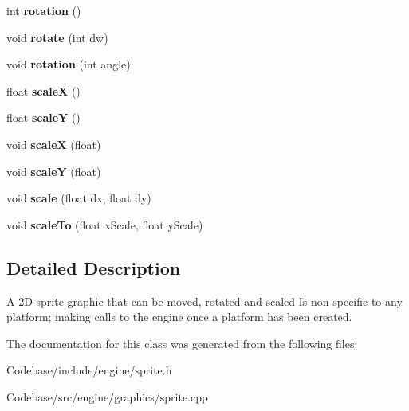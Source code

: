 \begin{DoxyCompactItemize}
\item 
\hypertarget{class_sprite_a6e4553db94d974d88543b5a658f6c0c7}{int {\bfseries rotation} ()}\label{class_sprite_a6e4553db94d974d88543b5a658f6c0c7}

\item 
\hypertarget{class_sprite_a52ff92ae9e183b44153f1832b0fe8d9c}{void {\bfseries rotate} (int dw)}\label{class_sprite_a52ff92ae9e183b44153f1832b0fe8d9c}

\item 
\hypertarget{class_sprite_aceb65d178240d6abf04cd9c27ed0e095}{void {\bfseries rotation} (int angle)}\label{class_sprite_aceb65d178240d6abf04cd9c27ed0e095}

\item 
\hypertarget{class_sprite_a2163af37f17518f7c2a294f8ecc12b1d}{float {\bfseries scale\-X} ()}\label{class_sprite_a2163af37f17518f7c2a294f8ecc12b1d}

\item 
\hypertarget{class_sprite_a683509398c5d1098b0503eb223dd21f5}{float {\bfseries scale\-Y} ()}\label{class_sprite_a683509398c5d1098b0503eb223dd21f5}

\item 
\hypertarget{class_sprite_ae03819f524c4b85cc2b735a677ff6c25}{void {\bfseries scale\-X} (float)}\label{class_sprite_ae03819f524c4b85cc2b735a677ff6c25}

\item 
\hypertarget{class_sprite_a874153ccccd9304af8d7c19c51dedd74}{void {\bfseries scale\-Y} (float)}\label{class_sprite_a874153ccccd9304af8d7c19c51dedd74}

\item 
\hypertarget{class_sprite_a09ad4f5df5c625c44e31f02e625a40d0}{void {\bfseries scale} (float dx, float dy)}\label{class_sprite_a09ad4f5df5c625c44e31f02e625a40d0}

\item 
\hypertarget{class_sprite_a625a3ba4a2e647cf1a4d88afe9237bb3}{void {\bfseries scale\-To} (float x\-Scale, float y\-Scale)}\label{class_sprite_a625a3ba4a2e647cf1a4d88afe9237bb3}

\end{DoxyCompactItemize}


\subsection{Detailed Description}
A 2\-D sprite graphic that can be moved, rotated and scaled Is non specific to any platform; making calls to the engine once a platform has been created. 

The documentation for this class was generated from the following files\-:\begin{DoxyCompactItemize}
\item 
Codebase/include/engine/sprite.\-h\item 
Codebase/src/engine/graphics/sprite.\-cpp\end{DoxyCompactItemize}
